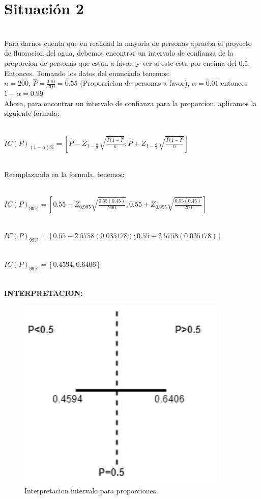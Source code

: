 \documentclass[letterpaper,12pt,onecolumn,titlepage]{article}
\begin{document}
\pagebreak\section{Situaci\'{o}n 2}
~\\ Para darnos cuenta que en realidad la mayoria de personas aprueba el proyecto de fluoracion del agua, debemos encontrar un intervalo de confianza de la proporcion de personas que estan a favor, y ver si este esta por encima del 0.5.
~\\ Entonces. Tomando los datos del enunciado tenemos:
~\\ $n=200$, $\hat{P}=\frac{110}{200}=0.55$ (Proporcicion de personas a favor), $\alpha=0.01$ entonces $1-\alpha=0.99$
~\\ Ahora, para encontrar un intervalo de confianza para la proporcion, aplicamos la siguiente formula:

~\\ $IC(P)_{(1-\alpha)\%}=\left[\hat{P}-Z_{1-\frac{\alpha}{2}}\sqrt{\frac{\hat{P}(1-\hat{P}}{n}};\hat{P}+Z_{1-\frac{\alpha}{2}}\sqrt{\frac{\hat{P}(1-\hat{P}}{n}}\right]$

~\\ Reemplazando en la formula, tenemos:

~\\ $IC(P)_{99\%}=\left[0.55-Z_{0.995}\sqrt{\frac{0.55(0.45)}{200}};0.55+Z_{0.995}\sqrt{\frac{0.55(0.45)}{200}}\right]$

~\\ $IC(P)_{99\%}=[0.55-2.5758(0.035178) ; 0.55+2.5758(0.035178)]$

~\\ $IC(P)_{99\%}=[0.4594 ; 0.6406]$

~\\ \textbf{INTERPRETACION:}
 \begin{figure}[!h]
    \begin{center}
        \includegraphics[width=10cm]{Figuras/Grafico1.png}
        \caption{Interpretacion intervalo para proporciones}
        \label{fig:Densidad}
    \end{center}
\end{figure}
\end{document}
